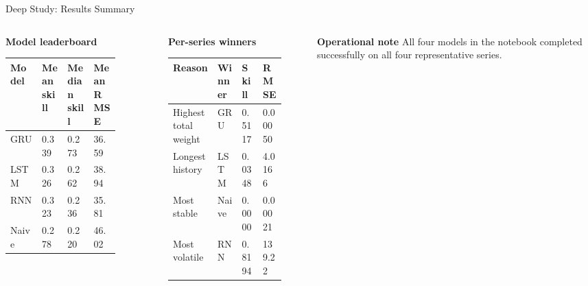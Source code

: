 \begin{frame}[t]{Deep Study: Results Summary}
  \vspace{0.35em}

  \begin{columns}[T,onlytextwidth]
    \begin{panelbox}
      \textbf{Model leaderboard}
      \small
      \begin{tabularx}{\linewidth}{L{0.22\linewidth}R{0.16\linewidth}R{0.18\linewidth}R{0.18\linewidth}}
        \toprule
        \textbf{Model} & \textbf{Mean skill} & \textbf{Median skill} & \textbf{Mean RMSE} \\
        \midrule
        GRU & 0.339 & 0.273 & 36.59 \\
        LSTM & 0.326 & 0.262 & 38.94 \\
        RNN & 0.323 & 0.236 & 35.81 \\
        Naive & 0.278 & 0.220 & 46.02 \\
        \bottomrule
      \end{tabularx}
    \end{panelbox}

    \begin{panelbox}
      \textbf{Per-series winners}
      \small
      \begin{tabularx}{\linewidth}{L{0.34\linewidth}L{0.18\linewidth}R{0.16\linewidth}R{0.16\linewidth}}
        \toprule
        \textbf{Reason} & \textbf{Winner} & \textbf{Skill} & \textbf{RMSE} \\
        \midrule
        Highest total weight & GRU & 0.5117 & 0.00050 \\
        Longest history & LSTM & 0.0348 & 4.0166 \\
        Most stable & Naive & 0.0000 & 0.00021 \\
        Most volatile & RNN & 0.8194 & 139.22 \\
        \bottomrule
      \end{tabularx}
    \end{panelbox}
    \vspace{0.25em}
    \begin{panelbox}
      \textbf{Operational note}
      All four models in the notebook completed successfully on all four representative series.
    \end{panelbox}
  \end{columns}
\end{frame}

